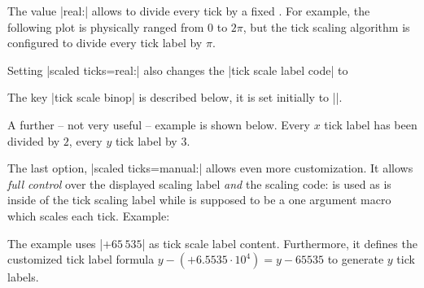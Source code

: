 \begin{pgfplotsxykeylist}
    The value |real:| allows to divide every tick by a fixed
    . For example, the following plot is physically ranged from $0$
    to $2\pi$, but the tick scaling algorithm is configured to divide every
    tick label by $\pi$.
\begin{codeexample}[]
\end{codeexample}
    \noindent Setting |scaled ticks=real:| also changes the
    |tick scale label code| to
\begin{codeexample}
\end{codeexample}
    \noindent The key |tick scale binop| is described below, it is set
    initially to |\cdot|.

    A further -- not very useful -- example is shown below. Every $x$ tick
    label has been divided by $2$, every $y$ tick label by $3$.
\nobreak
\begin{codeexample}[]
\end{codeexample}

    The last option, |scaled ticks=manual:| allows even
    more customization. It allows \emph{full control} over the displayed
    scaling label \emph{and} the scaling code:  is used as is
    inside of the tick scaling label while  is supposed to be a
    one argument macro which scales each tick. Example:
\begin{codeexample}[]
\end{codeexample}
    \noindent The example uses |$+65\,535$| as tick scale label content.
    Furthermore, it defines the customized tick label formula $y -
    (+6.5535\cdot 10^4) = y - 65535$ to generate $y$ tick labels.


\end{pgfplotsxykeylist}
